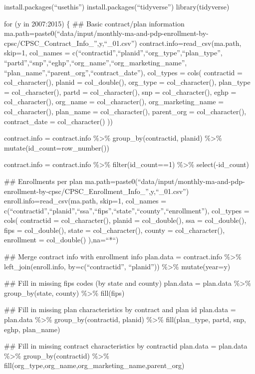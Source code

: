 \documentclass[
]{article}
\begin{document}
install.packages(``usethis'') install.packages(``tidyverse'')
library(tidyverse)

for (y in 2007:2015) \{ \#\# Basic contract/plan information
ma.path=paste0(``data/input/monthly-ma-and-pdp-enrollment-by-cpsc/CPSC\_Contract\_Info\_'',y,``\_01.csv'')
contract.info=read\_csv(ma.path, skip=1, col\_names =
c(``contractid'',``planid'',``org\_type'',``plan\_type'',
``partd'',``snp'',``eghp'',``org\_name'',``org\_marketing\_name'',
``plan\_name'',``parent\_org'',``contract\_date''), col\_types = cols(
contractid = col\_character(), planid = col\_double(), org\_type =
col\_character(), plan\_type = col\_character(), partd =
col\_character(), snp = col\_character(), eghp = col\_character(),
org\_name = col\_character(), org\_marketing\_name = col\_character(),
plan\_name = col\_character(), parent\_org = col\_character(),
contract\_date = col\_character() ))

contract.info = contract.info \%\textgreater\% group\_by(contractid,
planid) \%\textgreater\% mutate(id\_count=row\_number())

contract.info = contract.info \%\textgreater\% filter(id\_count==1)
\%\textgreater\% select(-id\_count)

\#\# Enrollments per plan
ma.path=paste0(``data/input/monthly-ma-and-pdp-enrollment-by-cpsc/CPSC\_Enrollment\_Info\_'',y,``\_01.csv'')
enroll.info=read\_csv(ma.path, skip=1, col\_names =
c(``contractid'',``planid'',``ssa'',``fips'',``state'',``county'',``enrollment''),
col\_types = cols( contractid = col\_character(), planid =
col\_double(), ssa = col\_double(), fips = col\_double(), state =
col\_character(), county = col\_character(), enrollment = col\_double()
),na=``*``)

\#\# Merge contract info with enrollment info plan.data = contract.info
\%\textgreater\% left\_join(enroll.info, by=c(``contractid'',
``planid'')) \%\textgreater\% mutate(year=y)

\#\# Fill in missing fips codes (by state and county) plan.data =
plan.data \%\textgreater\% group\_by(state, county) \%\textgreater\%
fill(fips)

\#\# Fill in missing plan characteristics by contract and plan id
plan.data = plan.data \%\textgreater\% group\_by(contractid, planid)
\%\textgreater\% fill(plan\_type, partd, snp, eghp, plan\_name)

\#\# Fill in missing contract characteristics by contractid plan.data =
plan.data \%\textgreater\% group\_by(contractid) \%\textgreater\%
fill(org\_type,org\_name,org\_marketing\_name,parent\_org)
\end{document}
